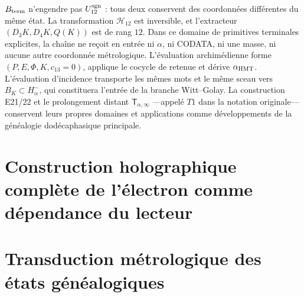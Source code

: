 \(B_{\rm term}\) n'engendre pas \(U_{12}^{\rm sgn}\) : tous deux conservent des coordonnées différentes du même état. La transformation \(\mathcal H_{12}\) est inversible, et l'extracteur \((D_3K,D_4K,Q(K))\) est de rang \(12\). Dans ce domaine de primitives terminales explicites, la chaîne ne reçoit en entrée ni \(\alpha\), ni CODATA, ni une masse, ni aucune autre coordonnée métrologique. L'évaluation archimédienne forme \((P,E,\Phi,K,c_{13}=0)\), applique le cocycle de retenue et dérive \(\alpha_{\rm HMT}\). L'évaluation d'incidence transporte les mêmes mots et le même sceau vers \(B_K\subset H_\alpha^-\), qui constituera l'entrée de la branche Witt--Golay. La construction E21/22 et le prolongement distant \(\mathsf T_{\alpha,\infty}\) ---appelé \(T1\) dans la notation originale--- conservent leurs propres domaines et applications comme développements de la généalogie dodécaphasique principale.

\HMTDemoteHeadings
{}
\HMTRestoreHeadings


\begingroup
\def\HMTInternalTraceability{1}
\endgroup


\chapter*{Construction holographique complète de l'électron comme dépendance du lecteur}

\chapter*{Transduction métrologique des états généalogiques}
